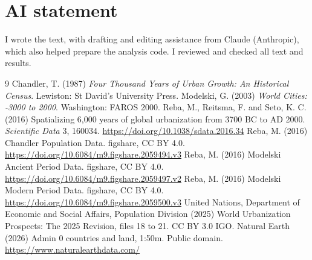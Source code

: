 \documentclass[11pt,a4paper]{article}
\begin{document}
\section*{AI statement}
I wrote the text, with drafting and editing assistance from Claude (Anthropic), which also helped prepare the analysis code. I reviewed and checked all text and results.

\begin{thebibliography}{9}
 Chandler, T. (1987) \textit{Four Thousand Years of Urban Growth: An Historical Census}. Lewiston: St David's University Press.
 Modelski, G. (2003) \textit{World Cities: -3000 to 2000}. Washington: FAROS 2000.
 Reba, M., Reitsma, F. and Seto, K. C. (2016) Spatializing 6,000 years of global urbanization from 3700 BC to AD 2000. \textit{Scientific Data} 3, 160034. \url{https://doi.org/10.1038/sdata.2016.34}
 Reba, M. (2016) Chandler Population Data. figshare, CC BY 4.0. \url{https://doi.org/10.6084/m9.figshare.2059494.v3}
 Reba, M. (2016) Modelski Ancient Period Data. figshare, CC BY 4.0. \url{https://doi.org/10.6084/m9.figshare.2059497.v2}
 Reba, M. (2016) Modelski Modern Period Data. figshare, CC BY 4.0. \url{https://doi.org/10.6084/m9.figshare.2059500.v3}
 United Nations, Department of Economic and Social Affairs, Population Division (2025) World Urbanization Prospects: The 2025 Revision, files 18 to 21. CC BY 3.0 IGO.
 Natural Earth (2026) Admin 0 countries and land, 1:50m. Public domain. \url{https://www.naturalearthdata.com/}
\end{thebibliography}
\end{document}
